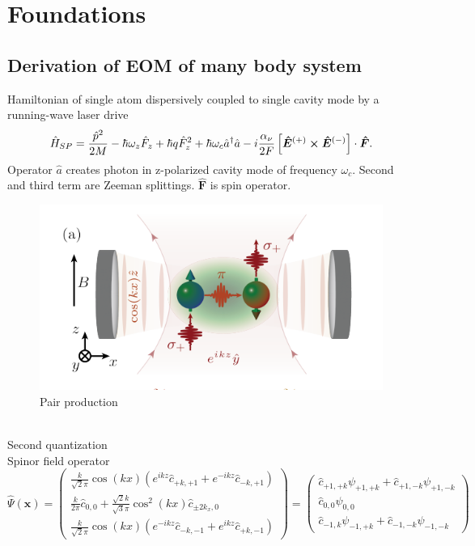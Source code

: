 \section{Foundations}
\subsection{Derivation of EOM of many body system}
Hamiltonian of single atom dispersively coupled to single cavity mode by a running-wave laser drive 
\begin{equation}
	\hat{H}_{SP} = \frac{\hat{p}^2}{2M}- \hbar \omega_z \hat{F}_z + \hbar q \hat{F}^2_z + \hbar \omega_c \hat{a}^\dag \hat{a}-i \frac{\alpha_\nu}{2F}\left [ \bm{\hat{E}}^{(+)} \cross \bm{\hat{E}}^{(-)} \right ] \cdot \bm{\hat{F}} .
\end{equation}
Operator $\hat{a}$ creates photon in z-polarized cavity mode of frequency $\omega_c$. Second and third term are Zeeman splittings. $\bm{\hat{F}}$ is spin operator.
\begin{figure}[h!]
	\centering
	\includegraphics[width=1\linewidth]{Images/scetch_pair_production.png}
	\caption{Pair production}
	\label{fig:scetch_pair_production}
\end{figure}
\\ \break
Second quantization 
\\ \break
Spinor field operator 
\begin{equation}
	\hat{\Psi} (\bm{x}) = \left (
	\begin{matrix}
		\frac{k}{\sqrt{2}\pi} \cos(kx) ( e^{ikz}\hat{c}_{+k,+1} + e^{-ikz} \hat{c}_{-k,+1})
		\\
		\frac{k}{2 \pi}\hat{c}_{0,0} + \frac{\sqrt{2}k}{\sqrt{3}\pi} \cos^2(kx)\hat{c}_{\pm2k_x,0}
		\\
		\frac{k}{\sqrt{2}\pi} \cos(kx) ( e^{-ikz}\hat{c}_{-k,-1} + e^{ikz} \hat{c}_{+k,-1})
	\end{matrix} \right)
	= \left (
	\begin{matrix}
		\hat{c}_{+1,+k} \psi_{+1,+k} + \hat{c}_{+1,-k} \psi_{+1,-k}
		\\
		\hat{c}_{0,0}\psi_{0,0} 
		\\
		\hat{c}_{-1,k} \psi_{-1,+k} + \hat{c}_{-1,-k}\psi_{-1,-k}
	\end{matrix}
	\right)
\end{equation}
